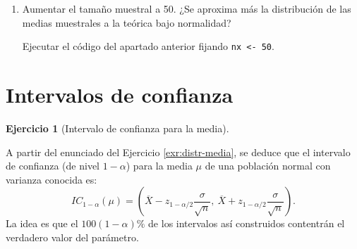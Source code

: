 \documentclass[
]{book}
\theoremstyle{break}
\theoremstyle{definition}
\theoremstyle{definition}
\theoremstyle{definition}
\newtheorem{exercise}{Ejercicio}[chapter]
\theoremstyle{definition}
\theoremstyle{remark}
\begin{document}
\vspace{0.5cm}

\begin{enumerate}
\def\labelenumi{\alph{enumi})}
\setcounter{enumi}{1}
\item
  Aumentar el tamaño muestral a 50. ¿Se aproxima más la
  distribución de las medias muestrales a la teórica bajo
  normalidad?

  Ejecutar el código del apartado anterior fijando \texttt{nx\ \textless{}-\ 50}.
\end{enumerate}

\hypertarget{intervalos-de-confianza}{%
\section{Intervalos de confianza}\label{intervalos-de-confianza}}

\begin{exercise}[Intervalo de confianza para la media]
\protect\hypertarget{exr:ic-media}{}{\label{exr:ic-media} {} }
\end{exercise}

A partir del enunciado del Ejercicio \ref{exr:distr-media}, se deduce que el intervalo de confianza (de nivel \(1-\alpha\)) para la media \(\mu\) de una población normal con varianza conocida es:
\[IC_{1-\alpha}\left(  \mu\right)  = 
\left(  \overline{X}-z_{1-\alpha/2}\dfrac{\sigma}{\sqrt{n}},\ \overline{X} 
+ z_{1-\alpha/2}\dfrac{\sigma}{\sqrt{n}} \right).\]
La idea es que el \(100(1-\alpha)\%\) de los intervalos así construidos contentrán el verdadero valor del parámetro.
\end{document}
